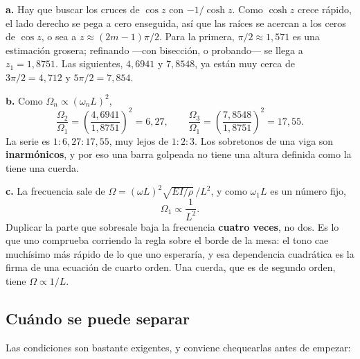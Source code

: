 \documentclass[
  spanish,
  a4paper,
]{scrbook}
\theoremstyle{definition}
\theoremstyle{plain}
\theoremstyle{definition}
\theoremstyle{plain}
\theoremstyle{definition}
\theoremstyle{remark}
\begin{document}
\begin{tcolorbox}[enhanced jigsaw, arc=.35mm, bottomrule=.15mm, bottomtitle=1mm, breakable, colback=white, colbacktitle=quarto-callout-tip-color!10!white, colframe=quarto-callout-tip-color-frame, coltitle=black, left=2mm, leftrule=.75mm, opacityback=0, opacitybacktitle=0.6, rightrule=.15mm, title=\textcolor{quarto-callout-tip-color}{\faLightbulb}\hspace{0.5em}{Solución}, titlerule=0mm, toprule=.15mm, toptitle=1mm]

\textbf{a.} Hay que buscar los cruces de \(\cos z\) con \(-1/\cosh z\).
Como \(\cosh z\) crece rápido, el lado derecho se pega a cero enseguida,
así que las raíces se acercan a los ceros de \(\cos z\), o sea a
\(z \approx (2m-1)\pi/2\). Para la primera, \(\pi/2 \approx 1{,}571\) es
una estimación grosera; refinando ---con bisección, o probando--- se
llega a \(z_1 = 1{,}8751\). Las siguientes, \(4{,}6941\) y \(7{,}8548\),
ya están muy cerca de \(3\pi/2 = 4{,}712\) y \(5\pi/2 = 7{,}854\).

\textbf{b.} Como \(\Omega_n \propto (\omega_nL)^2\), \[
\frac{\Omega_2}{\Omega_1} = \left(\frac{4{,}6941}{1{,}8751}\right)^2 = 6{,}27, \qquad
\frac{\Omega_3}{\Omega_1} = \left(\frac{7{,}8548}{1{,}8751}\right)^2 = 17{,}55 .
\] La serie es \(1 : 6{,}27 : 17{,}55\), muy lejos de \(1:2:3\). Los
sobretonos de una viga son \textbf{inarmónicos}, y por eso una barra
golpeada no tiene una altura definida como la tiene una cuerda.

\textbf{c.} La frecuencia sale de
\(\Omega = (\omega L)^2\sqrt{EI/\rho}\,/L^2\), y como \(\omega_1L\) es
un número fijo, \[\Omega_1 \propto \frac{1}{L^2} .\] Duplicar la parte
que sobresale baja la frecuencia \textbf{cuatro veces}, no dos. Es lo
que uno comprueba corriendo la regla sobre el borde de la mesa: el tono
cae muchísimo más rápido de lo que uno esperaría, y esa dependencia
cuadrática es la firma de una ecuación de cuarto orden. Una cuerda, que
es de segundo orden, tiene \(\Omega \propto 1/L\).

\end{tcolorbox}

\subsection{Cuándo se puede separar}\label{sec-cuando-separar}

Las condiciones son bastante exigentes, y conviene chequearlas antes de
empezar:
\end{document}
